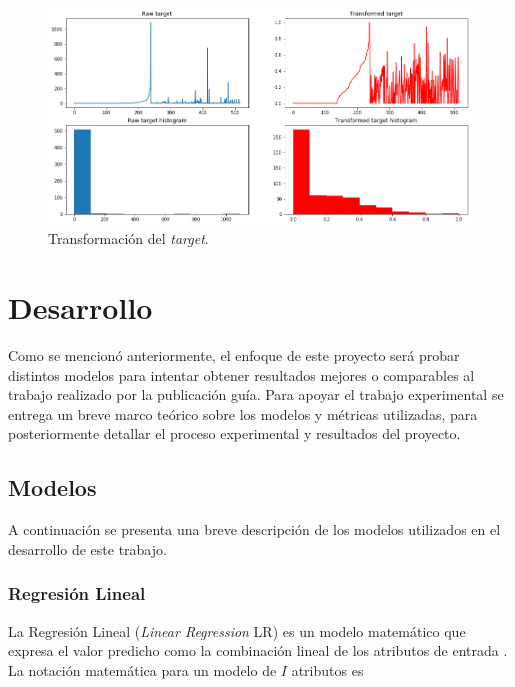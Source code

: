 \documentclass[spanish]{article}
\begin{document}
      \begin{figure}[!ht]
        \centering
        \includegraphics[width=\textwidth]{figures/target_transformation.png}
        \caption{Transformación del \emph{target}.}
        \label{fig:target_transform}
      \end{figure}
            
    \section{Desarrollo}
    
      Como se mencionó anteriormente, el enfoque de este proyecto será probar distintos modelos para 
      intentar obtener resultados mejores o comparables al trabajo realizado por la publicación guía. 
      Para apoyar el trabajo experimental se entrega un breve marco teórico sobre los modelos y métricas 
      utilizadas, para posteriormente detallar el proceso experimental y resultados del proyecto.
      
      \subsection{Modelos}
      
        A continuación se presenta una breve descripción de los modelos utilizados en el desarrollo 
        de este trabajo.
    
        \subsubsection{Regresión Lineal}
        
          La Regresión Lineal (\emph{Linear Regression} LR) es un modelo matemático que expresa el 
          valor predicho como la combinación lineal de los atributos de entrada \cite{seal1967studies}. 
          La notación matemática para un modelo de $I$ atributos es
      
\end{document}
